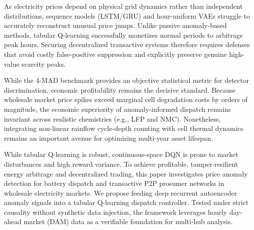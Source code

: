 \documentclass[journal]{IEEEtran}
\begin{document}
As electricity prices depend on physical grid dynamics rather than independent distributions, sequence models (LSTM/GRU) and hour-uniform VAEs struggle to accurately reconstruct unusual price jumps. Unlike passive anomaly-based methods, tabular Q-learning successfully monetizes normal periods to arbitrage peak hours. Securing decentralized transactive systems therefore requires defenses that avoid costly false-positive suppression and explicitly preserve genuine high-value scarcity peaks.


While the 4-MAD benchmark provides an objective statistical metric for detector discrimination, economic profitability remains the decisive standard. Because wholesale market price spikes exceed marginal cell degradation costs by orders of magnitude, the economic superiority of anomaly-informed dispatch remains invariant across realistic chemistries (e.g., LFP and NMC). Nonetheless, integrating non-linear rainflow cycle-depth counting with cell thermal dynamics remains an important avenue for optimizing multi-year asset lifespan.

While tabular Q-learning is robust, continuous-space DQN is prone to market disturbances and high reward variance. To achieve profitable, tamper-resilient energy arbitrage and decentralized trading, this paper investigates price anomaly detection for battery dispatch and transactive P2P prosumer networks in wholesale electricity markets. We propose feeding deep recurrent autoencoder anomaly signals into a tabular Q-learning dispatch controller. Tested under strict causality without synthetic data injection, the framework leverages hourly day-ahead market (DAM) data as a verifiable foundation for multi-hub analysis.
\end{document}
